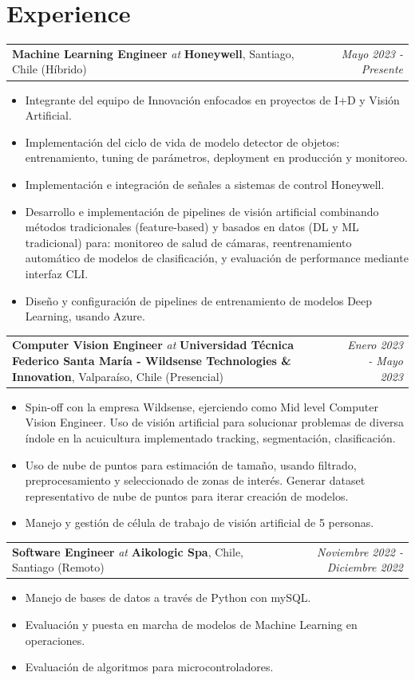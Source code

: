 \documentclass[11pt, letterpaper]{article}
\makeatletter
\newcommand{\experience}[5]{%
  \noindent
  \begin{tabularx}{\linewidth}{@{}X r@{}}
    \textbf{#1} \textit{at} \textbf{#2}, #3 & \textit{#4}
  \end{tabularx}
  \vspace{-10pt}
  #5
  \vspace{2pt}
}
\makeatother
\begin{document}
\section{Experience}
\experience
  {Machine Learning Engineer}
  {Honeywell}
  {Santiago, Chile (Híbrido)}
  {Mayo 2023 - Presente}
  {
    \begin{itemize}
      \item Integrante del equipo de Innovación enfocados en proyectos de I+D y Visión Artificial.
      \item Implementación del ciclo de vida de modelo detector de objetos: entrenamiento, tuning de parámetros, deployment en producción y monitoreo.
      \item Implementación e integración de señales a sistemas de control Honeywell.
      \item Desarrollo e implementación de pipelines de visión artificial combinando métodos tradicionales (feature-based) y basados en datos (DL y ML tradicional) para: monitoreo de salud de cámaras, reentrenamiento automático de modelos de clasificación, y evaluación de performance mediante interfaz CLI.
      \item Diseño y configuración de pipelines de entrenamiento de modelos Deep Learning, usando Azure.
    \end{itemize}
  }
\experience
  {Computer Vision Engineer}
  {Universidad Técnica Federico Santa María - Wildsense Technologies \& Innovation}
  {Valparaíso, Chile (Presencial)}
  {Enero 2023 - Mayo 2023}
  {
    \begin{itemize}
        \item Spin-off con la empresa Wildsense, ejerciendo como Mid level Computer Vision Engineer. Uso de visión artificial para solucionar problemas de diversa índole en la acuicultura implementado tracking, segmentación, clasificación.
        \item Uso de nube de puntos para estimación de tamaño, usando filtrado, preprocesamiento y seleccionado de zonas de interés. Generar dataset representativo de nube de puntos para iterar creación de modelos.
        \item Manejo y gestión de célula de trabajo de visión artificial de 5 personas.
    \end{itemize}
  }
\experience
  {Software Engineer}
  {Aikologic Spa}
  {Chile, Santiago (Remoto)}
  {Noviembre 2022 - Diciembre 2022}
  {
    \begin{itemize}
        \item Manejo de bases de datos a través de Python con mySQL.
        \item Evaluación y puesta en marcha de modelos de Machine Learning en operaciones. 
        \item Evaluación de algoritmos para microcontroladores.
    \end{itemize}
  }
\end{document}
